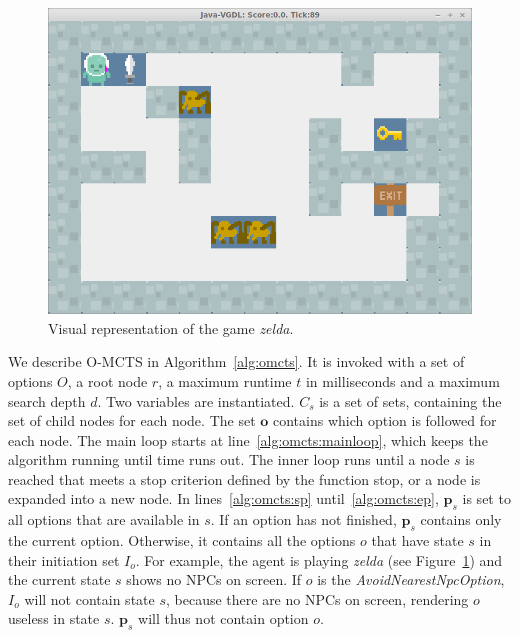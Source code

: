 \begin{figure}
	\centering
	\includegraphics[width=\columnwidth]{includes/zelda}
	\caption{Visual representation of the game \textit{zelda}.}
	\label{fig:zelda}
\end{figure}

We describe O-MCTS in Algorithm~\ref{alg:omcts}. It is invoked with a set of
options $O$, a root node $r$, a maximum runtime $t$ in milliseconds and a
maximum search depth $d$. Two variables are instantiated. $C_s$ is a set of
sets, containing the set of child nodes for each node. The set $\mathbf{o}$
contains which option is followed for each node. The main loop starts at 
line~\ref{alg:omcts:mainloop}, which keeps the algorithm running until time runs out.
The inner loop runs until a node $s$ is reached that meets a stop criterion
defined by the function \textsf{stop}, or a node is expanded into a new node.
In lines~\ref{alg:omcts:sp} until~\ref{alg:omcts:ep}, $\mathbf{p}_s$ is set to
all options that are available in $s$. If an option has not finished,
$\mathbf{p}_s$ contains only the current option. Otherwise, it contains all the
options $o$ that have state $s$ in their initiation set $I_o$. For example,
the agent is playing \textit{zelda} (see Figure~\ref{fig:zelda}) and the current
state $s$ shows no NPCs on screen. If $o$ is the \textit{AvoidNearestNpcOption},
$I_o$ will not contain state $s$, because there are no NPCs on screen, rendering
$o$ useless in state $s$. $\mathbf{p}_s$ will thus not contain option $o$.

